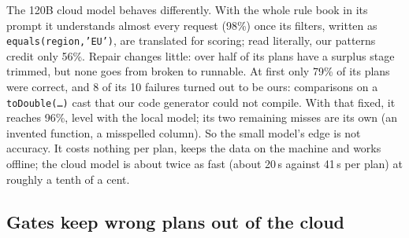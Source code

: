 \documentclass[runningheads]{llncs}
\begin{document}
The 120B cloud model behaves differently. With the whole rule book in its prompt it understands
almost every request (98\%) once its filters, written as \texttt{equals(region,'EU')}, are translated
for scoring; read literally, our patterns credit only 56\%. Repair changes little: over half of its
plans have a surplus stage trimmed, but none goes from broken to runnable. At first only 79\% of its
plans were correct, and 8 of its 10 failures turned out to be ours: comparisons on a
\texttt{toDouble(\ldots)} cast that our code generator could not compile. With that fixed, it reaches
96\%, level with the local model; its two remaining misses are its own (an invented function, a
misspelled column). So the small model's edge is not accuracy. It costs nothing per plan, keeps the
data on the machine and works offline; the cloud model is about twice as fast (about 20\,s against
41\,s per plan) at roughly a tenth of a cent.

\subsection{Gates keep wrong plans out of the cloud}
\label{sec:gates}
\end{document}
